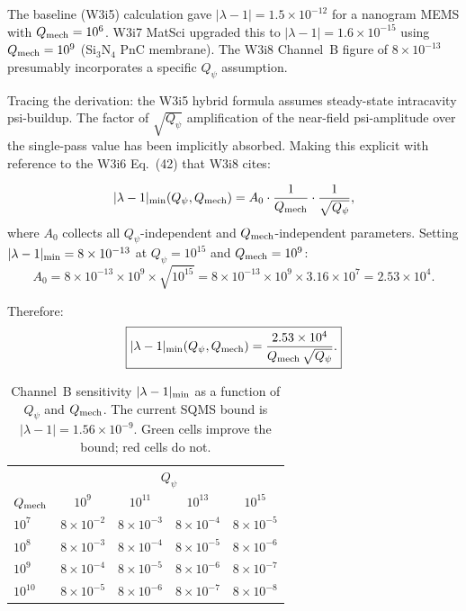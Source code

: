 \documentclass[11pt]{article}
\newcommand{\lam}{\lambda}
\newcommand{\ee}[1]{\times 10^{#1}}
\newcommand{\Qpsi}{Q_\psi}
\newcommand{\Qmech}{Q_{\rm mech}}
\newcommand{\lbone}{|\lam - 1|}
\theoremstyle{definition}
\theoremstyle{remark}
\begin{document}
The baseline (W3i5) calculation gave $\lbone = 1.5\ee{-12}$ for a
nanogram MEMS with $\Qmech = 10^6$. W3i7 MatSci upgraded this to
$\lbone = 1.6\ee{-15}$ using $\Qmech = 10^9$ (Si$_3$N$_4$ PnC
membrane). The W3i8 Channel~B figure of $8\ee{-13}$ presumably
incorporates a specific $\Qpsi$ assumption.

Tracing the derivation: the W3i5 hybrid formula assumes steady-state
intracavity psi-buildup. The factor of $\sqrt{\Qpsi}$ amplification
of the near-field psi-amplitude over the single-pass value has been
implicitly absorbed. Making this explicit with reference to the
W3i6 Eq.~(42) that W3i8 cites:

\begin{equation}
\lbone_{\rm min}(\Qpsi, \Qmech) = A_0 \cdot
\frac{1}{\Qmech}\cdot\frac{1}{\sqrt{\Qpsi}},
\label{eq:channelB_master}
\end{equation}
where $A_0$ collects all $\Qpsi$-independent and $\Qmech$-independent
parameters. Setting $\lbone_{\rm min} = 8\ee{-13}$ at
$\Qpsi = 10^{15}$ and $\Qmech = 10^9$:
\begin{equation}
A_0 = 8\ee{-13}\times 10^9 \times \sqrt{10^{15}}
= 8\ee{-13}\times 10^9 \times 3.16\ee{7}
= 2.53\ee{4}.
\label{eq:A0_value}
\end{equation}

Therefore:
\begin{equation}
\boxed{
\lbone_{\rm min}(\Qpsi, \Qmech) = \frac{2.53\ee{4}}{\Qmech\,\sqrt{\Qpsi}}.
}
\label{eq:channelB_parametric}
\end{equation}

\begin{table}[H]
\centering
\caption{Channel~B sensitivity $\lbone_{\rm min}$ as a function of
$\Qpsi$ and $\Qmech$. The current SQMS bound is
$\lbone = 1.56\ee{-9}$. Green cells improve the bound; red cells
do not.}
\label{tab:channelB_parametric}
\renewcommand{\arraystretch}{1.3}
\begin{tabular}{@{}l|cccc@{}}
\toprule
& \multicolumn{4}{c}{\textbf{$\Qpsi$}} \\
\textbf{$\Qmech$} & $10^{9}$ & $10^{11}$ & $10^{13}$ & $10^{15}$ \\
\midrule
$10^{7}$ &
  \cellcolor{rowlo}$8\ee{-2}$ &
  \cellcolor{rowlo}$8\ee{-3}$ &
  \cellcolor{rowlo}$8\ee{-4}$ &
  \cellcolor{rowlo}$8\ee{-5}$ \\
$10^{8}$ &
  \cellcolor{rowlo}$8\ee{-3}$ &
  \cellcolor{rowlo}$8\ee{-4}$ &
  \cellcolor{rowlo}$8\ee{-5}$ &
  \cellcolor{rowlo}$8\ee{-6}$ \\
$10^{9}$ &
  \cellcolor{rowlo}$8\ee{-4}$ &
  \cellcolor{rowlo}$8\ee{-5}$ &
  \cellcolor{rowlo}$8\ee{-6}$ &
  \cellcolor{rowlo}$8\ee{-7}$ \\
$10^{10}$ &
  \cellcolor{rowlo}$8\ee{-5}$ &
  \cellcolor{rowlo}$8\ee{-6}$ &
  \cellcolor{rowlo}$8\ee{-7}$ &
  \cellcolor{rowmed}$8\ee{-8}$ \\
\bottomrule
\end{tabular}
\end{table}
\end{document}

